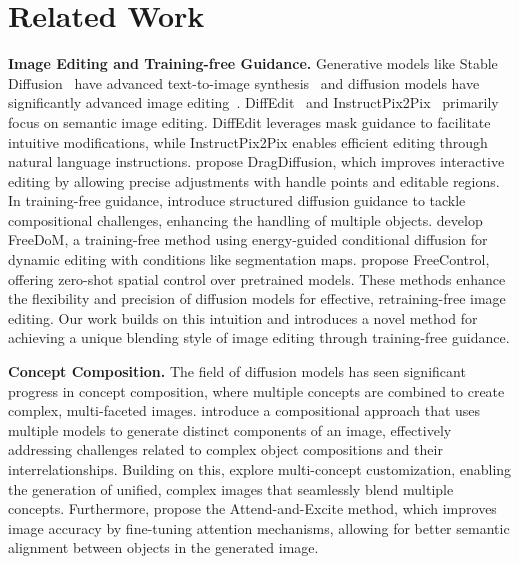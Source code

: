 \section{Related Work}
\textbf{Image Editing and Training-free Guidance. }Generative models like Stable Diffusion~\citep{rombach2022high} have advanced text-to-image synthesis~\citep{podellsdxl, zhang2023adding, gu2022vector} and diffusion models have significantly advanced image editing~\citep{balaji2022ediff, couairon2022diffedit, brooks2023instructpix2pix}. DiffEdit~\citep{couairon2022diffedit} and InstructPix2Pix~\citep{brooks2023instructpix2pix} primarily focus on semantic image editing. DiffEdit leverages mask guidance to facilitate intuitive modifications, while InstructPix2Pix enables efficient editing through natural language instructions. \citet{shi2024dragdiffusion} propose DragDiffusion, which improves interactive editing by allowing precise adjustments with handle points and editable regions. In training-free guidance, \citet{feng2022training} introduce structured diffusion guidance to tackle compositional challenges, enhancing the handling of multiple objects. \citet{yu2023freedom} develop FreeDoM, a training-free method using energy-guided conditional diffusion for dynamic editing with conditions like segmentation maps. \citet{mo2024freecontrol} propose FreeControl, offering zero-shot spatial control over pretrained models. These methods enhance the flexibility and precision of diffusion models for effective, retraining-free image editing. Our work builds on this intuition and introduces a novel method for achieving a unique blending style of image editing through training-free guidance.

\textbf{Concept Composition. }The field of diffusion models has seen significant progress in concept composition, where multiple concepts are combined to create complex, multi-faceted images. \citet{liu2022compositional} introduce a compositional approach that uses multiple models to generate distinct components of an image, effectively addressing challenges related to complex object compositions and their interrelationships. Building on this, \citet{kumari2023multi} explore multi-concept customization, enabling the generation of unified, complex images that seamlessly blend multiple concepts. Furthermore, \citet{chefer2023attend} propose the Attend-and-Excite method, which improves image accuracy by fine-tuning attention mechanisms, allowing for better semantic alignment between objects in the generated image. 

